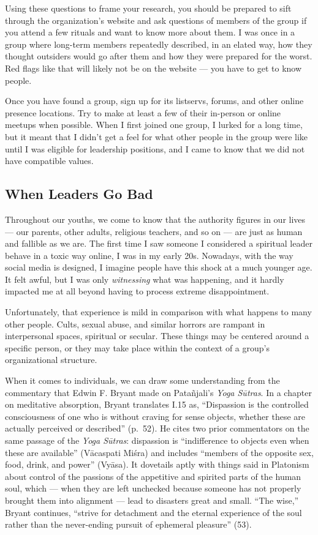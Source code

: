 \documentclass[
]{book}
\begin{document}
Using these questions to frame your research, you should be prepared to sift through the organization's website and ask questions of members of the group if you attend a few rituals and want to know more about them. I was once in a group where long-term members repeatedly described, in an elated way, how they thought outsiders would go after them and how they were prepared for the worst. Red flags like that will likely not be on the website --- you have to get to know people.

Once you have found a group, sign up for its listservs, forums, and other online presence locations. Try to make at least a few of their in-person or online meetups when possible. When I first joined one group, I lurked for a long time, but it meant that I didn't get a feel for what other people in the group were like until I was eligible for leadership positions, and I came to know that we did not have compatible values.

\hypertarget{when-leaders-go-bad}{%
\subsection{When Leaders Go Bad}\label{when-leaders-go-bad}}

Throughout our youths, we come to know that the authority figures in our lives --- our parents, other adults, religious teachers, and so on --- are just as human and fallible as we are. The first time I saw someone I considered a spiritual leader behave in a toxic way online, I was in my early 20s. Nowadays, with the way social media is designed, I imagine people have this shock at a much younger age. It felt awful, but I was only \emph{witnessing} what was happening, and it hardly impacted me at all beyond having to process extreme disappointment.

Unfortunately, that experience is mild in comparison with what happens to many other people. Cults, sexual abuse, and similar horrors are rampant in interpersonal spaces, spiritual or secular. These things may be centered around a specific person, or they may take place within the context of a group's organizational structure.

When it comes to individuals, we can draw some understanding from the commentary that Edwin F. Bryant made on Patañjali's \emph{Yoga Sūtras}. In a chapter on meditative absorption, Bryant translates I.15 as, ``Dispassion is the controlled consciousness of one who is without craving for sense objects, whether these are actually perceived or described'' (p.~52). He cites two prior commentators on the same passage of the \emph{Yoga Sūtras}: dispassion is ``indifference to objects even when these are available'' (Vācaspati Miśra) and includes ``members of the opposite sex, food, drink, and power'' (Vyāsa). It dovetails aptly with things said in Platonism about control of the passions of the appetitive and spirited parts of the human soul, which --- when they are left unchecked because someone has not properly brought them into alignment --- lead to disasters great and small. ``The wise,'' Bryant continues, ``strive for detachment and the eternal experience of the soul rather than the never-ending pursuit of ephemeral pleasure'' (53).
\end{document}
